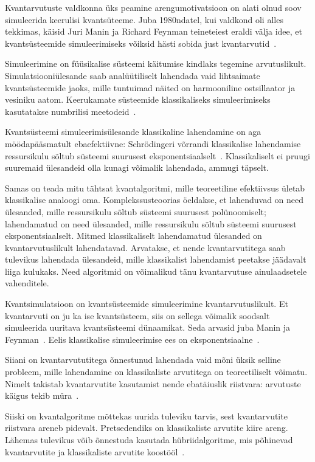 \documentclass[12pt]{report}
\begin{document}
Kvantarvutuste valdkonna üks peamine arengumotivatsioon on alati olnud soov simuleerida keerulisi kvantsüteeme.
Juba 1980ndatel, kui valdkond oli alles tekkimas, käisid Juri Manin ja Richard Feynman teineteiest eraldi välja idee, et kvantsüsteemide simuleerimiseks võiksid hästi sobida just kvantarvutid~\cite{manin, feynman}.

Simuleerimine on füüsikalise süsteemi käitumise kindlaks tegemine arvutuslikult.
Simulatsiooniülesande saab analüütiliselt lahendada vaid lihtsaimate kvantsüsteemide jaoks, mille tuntuimad näited on harmooniline ostsillaator ja vesiniku aatom.
Keerukamate süsteemide klassikaliseks simuleerimiseks kasutatakse numbrilisi meetodeid~\cite{szabo+ostlund, whitfield+etal2011}.

Kvantsüsteemi simuleerimisülesande klassikaline lahendamine on aga möödapääsmatult ebaefektiivne: Schrödingeri võrrandi klassikalise lahendamise ressursikulu sõltub süsteemi suurusest eksponentsiaalselt~\cite{whitfield+etal2011, mcardle+etal, cao+etal, kassal+etal}.
Klassikaliselt ei pruugi suuremaid ülesandeid olla kunagi võimalik lahendada, ammugi täpselt.

Samas on teada mitu tähtsat kvantalgoritmi, mille teoreetiline efektiivsus ületab klassikalise analoogi oma.
Komplekssusteoorias öeldakse, et lahenduvad on need ülesanded, mille ressursikulu sõltub süsteemi suurusest polünoomiselt; lahendamatud on need ülesanded, mille ressursikulu sõltub süsteemi suurusest eksponentsiaalselt.
Mitmed klassikaliselt lahendamatud ülesanded on kvantarvutuslikult lahendatavad.
Arvatakse, et nende kvantarvutitega saab tulevikus lahendada ülesandeid, mille klassikalist lahendamist peetakse jäädavalt liiga kulukaks.
Need algoritmid on võimalikud tänu kvantarvutuse ainulaadsetele vahenditele.

Kvantsimulatsioon on kvantsüsteemide simuleerimine kvantarvutuslikult.
Et kvantarvuti on ju ka ise kvantsüsteem, siis on sellega võimalik soodsalt simuleerida uuritava kvantsüsteemi dünaamikat.
Seda arvasid juba Manin ja Feynman~\cite{manin, feynman}.
Eelis klassikalise simuleerimise ees on eksponentsiaalne~\cite{whitfield+etal2011, mcardle+etal, cao+etal}.

Siiani on kvantarvututitega õnnestunud lahendada vaid mõni üksik selline probleem, mille lahendamine on klassikaliste arvutitega on teoreetiliselt võimatu.
Nimelt takistab kvantarvutite kasutamist nende ebatäiuslik riistvara: arvutuste käigus tekib müra~\cite{whitfield+etal2022}.

Siiski on kvantalgoritme mõttekas uurida tuleviku tarvis, sest kvantarvutite riistvara areneb pidevalt.
Pretsedendiks on klassikaliste arvutite kiire areng.
Lähemas tulevikus võib õnnestuda kasutada hübriidalgoritme, mis põhinevad kvantarvutite ja klassikaliste arvutite koostööl~\cite{omalley+etal}.
\end{document}
